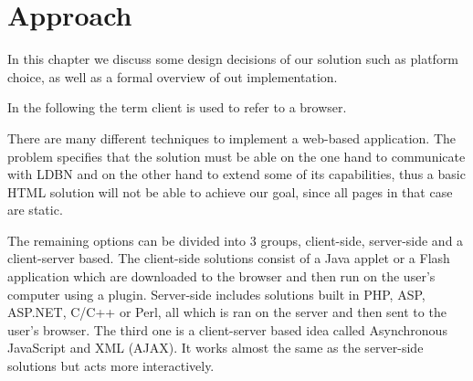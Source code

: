 \chapter{Approach}
\label{chap:approach}

In this chapter we discuss some design decisions of our solution such as 
platform choice, as well as a formal overview of out implementation. 

In the following the term client is used to refer to a
browser.

There are many different techniques to implement a web-based application. 
The problem specifies that the solution must be able  on the one hand to communicate with LDBN 
and on the other hand to extend some of its capabilities, 
thus a basic HTML solution will not be able to achieve our goal, 
since all pages in that case are static. 

The remaining options can be divided into 3 groups, client-side, server-side and
a client-server based. The client-side solutions consist of a Java applet or a Flash
application which are downloaded to the browser and then run on the user's computer
using a plugin. Server-side includes solutions built in PHP, ASP, ASP.NET, C/C++ or
Perl, all which is ran on the server and then sent to the user's browser. The third one is
a client-server based idea called Asynchronous JavaScript and XML (AJAX). It works
almost the same as the server-side solutions but acts more interactively. 



